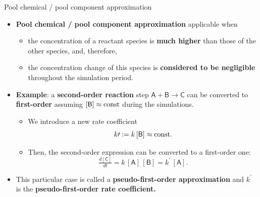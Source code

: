 \begin{frame}{Pool chemical / pool component approximation}
	\small
	\begin{itemize}
		\item \alert{\bf Pool chemical / pool component approximation} applicable when 
		\begin{itemize}
			\item the concentration of a reactant species is {\bf much higher} than those of the other species, and, therefore, 
			\item the concentration change of this species is {\bf considered to be negligible} throughout the simulation period.
		\end{itemize}
	    \pause
		\item \alert{\bf Example}: a {\bf second-order reaction} step $\mathsf{A+ B \rightarrow C}$ can be converted to {\bf first-order} 
		assuming $\mathsf{[B]} \approx {\rm const}$ during the simulations.
		\begin{itemize}
			\item We introduce a new rate coefficient
			\[k\prime := k \, \mathsf{[B]} \approx {\rm const}.\]
			\vskip -10pt
			\item Then, the second-order expression can be converted to a first-order one: 
			\[
			\tfrac{d\mathsf{[C]}}{dt} = k \, \mathsf{[A]\,[B]} = k^\prime \, \mathsf{[A]}.
			\]
			\vskip -10pt
		\end{itemize}
		\pause
		\item This particular case is called a  \alert{\bf pseudo-first-order approximation} and 
		$k^\prime$ is the \alert{\bf pseudo-first-order rate coefficient.}
	\end{itemize}
\end{frame}
%
%
